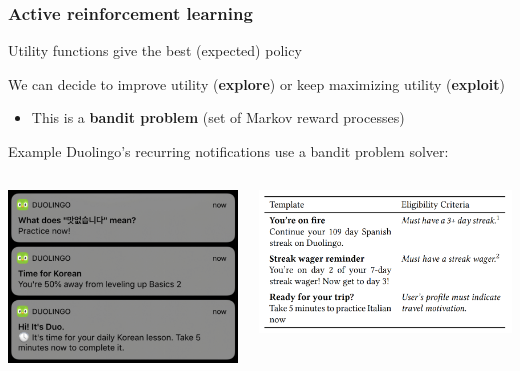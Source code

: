 \documentclass{beamer}
\begin{document}
\begin{frame}
	\frametitle{Active reinforcement learning}
	Utility functions give the best (expected) policy
	
	We can decide to improve utility (\textbf{explore}) or keep maximizing utility (\textbf{exploit})
	\begin{itemize}
		\item This is a \textbf{bandit problem} (set of Markov reward processes)
	\end{itemize}
	\pause
	\begin{block}{Example}
		Duolingo's recurring notifications use a bandit problem solver:
		\begin{columns}
		\begin{column}{0.4\textwidth}
			\begin{center}
				\includegraphics[scale=0.24]{figures/duolingo_notifications.png}
			\end{center}
		\end{column}
		\begin{column}{0.6\textwidth} %
			\begin{center}
				\includegraphics[scale=0.25]{figures/duolingo_eligibility.png}
			\end{center}
		\end{column}
		\end{columns}
	\end{block}
\end{frame}
\end{document}
